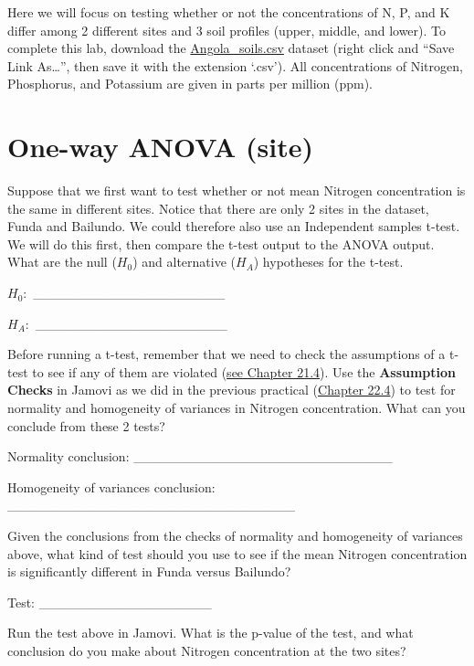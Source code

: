 \documentclass[
]{scrbook}
\begin{document}
Here we will focus on testing whether or not the concentrations of N, P, and K differ among 2 different sites and 3 soil profiles (upper, middle, and lower).
To complete this lab, download the \href{https://raw.githubusercontent.com/bradduthie/SCIU4T4/main/data/Angola_soils.csv}{Angola\_soils.csv} dataset (right click and ``Save Link As\ldots{}'', then save it with the extension `.csv').
All concentrations of Nitrogen, Phosphorus, and Potassium are given in parts per million (ppm).

\hypertarget{one-way-anova-site}{%
\section{One-way ANOVA (site)}\label{one-way-anova-site}}

Suppose that we first want to test whether or not mean Nitrogen concentration is the same in different sites.
Notice that there are only 2 sites in the dataset, Funda and Bailundo.
We could therefore also use an Independent samples t-test.
We will do this first, then compare the t-test output to the ANOVA output.
What are the null (\(H_{0}\)) and alternative (\(H_{A}\)) hypotheses for the t-test.

\(H_{0}:\) \_\_\_\_\_\_\_\_\_\_\_\_\_\_\_\_\_\_\_\_

\(H_{A}:\) \_\_\_\_\_\_\_\_\_\_\_\_\_\_\_\_\_\_\_\_

Before running a t-test, remember that we need to check the assumptions of a t-test to see if any of them are violated (\protect\hyperlink{assumptions-of-t-tests}{see Chapter 21.4}).
Use the \textbf{Assumption Checks} in Jamovi as we did in the previous practical (\protect\hyperlink{independent-samples-t-test-1}{Chapter 22.4}) to test for normality and homogeneity of variances in Nitrogen concentration.
What can you conclude from these 2 tests?

Normality conclusion: \_\_\_\_\_\_\_\_\_\_\_\_\_\_\_\_\_\_\_\_\_\_\_\_\_\_\_

Homogeneity of variances conclusion: \_\_\_\_\_\_\_\_\_\_\_\_\_\_\_\_\_\_\_\_\_\_\_\_\_\_\_\_\_\_

Given the conclusions from the checks of normality and homogeneity of variances above, what kind of test should you use to see if the mean Nitrogen concentration is significantly different in Funda versus Bailundo?

Test: \_\_\_\_\_\_\_\_\_\_\_\_\_\_\_\_\_\_

Run the test above in Jamovi.
What is the p-value of the test, and what conclusion do you make about Nitrogen concentration at the two sites?
\end{document}

